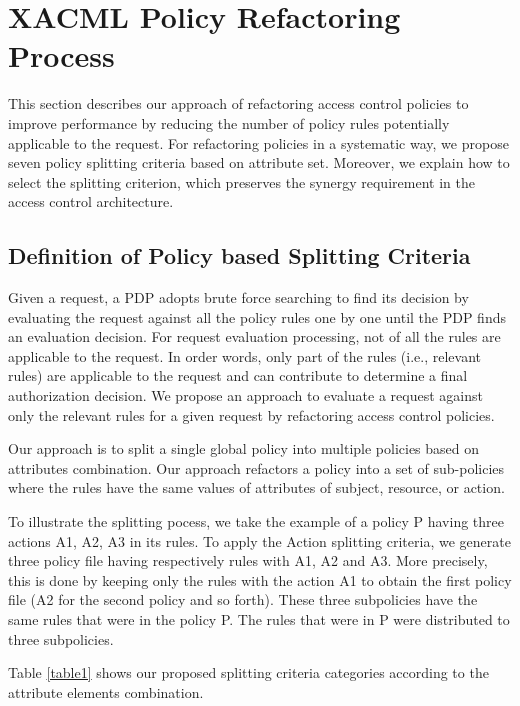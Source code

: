 \section{XACML Policy Refactoring Process} \label{sec:approach}
This section describes our approach of refactoring access control policies to improve performance by reducing the number of policy rules potentially applicable to the request.
For refactoring policies in a systematic way, we propose seven policy splitting criteria
based on attribute set. Moreover, we explain how to select the splitting criterion, which preserves the synergy requirement in the access control architecture.




\subsection{Definition of Policy based Splitting Criteria} \label{subsec:SplittingCriteria}


Given a request, a PDP adopts brute force searching to find its decision
by evaluating the request against all the policy rules one by one until the PDP finds an evaluation decision.
For request evaluation processing, not of all the rules are applicable to the request.
In order words, only part of the rules (i.e., relevant rules) are applicable to the request and can contribute
to determine a final authorization decision.
We propose an approach to evaluate a request against only the relevant rules for a given request by refactoring
access control policies.

Our approach is to split a single global policy into multiple policies based on attributes combination.
Our approach refactors a policy into a set of sub-policies where the rules have the same values of attributes of subject, resource, or
action.


To illustrate the splitting pocess, we take the example of a policy P having three actions A1, A2, A3 in its rules. To apply the Action splitting criteria, we generate three policy file having respectively rules with A1, A2 and A3. More precisely, this is done by keeping only the rules with the action A1 to obtain the first policy file (A2 for the second policy and so forth). These three subpolicies have the same rules that were in the 
policy P. The rules that were in P were distributed to three subpolicies.

Table \ref{table1} shows our proposed splitting criteria categories according to the attribute elements combination.

